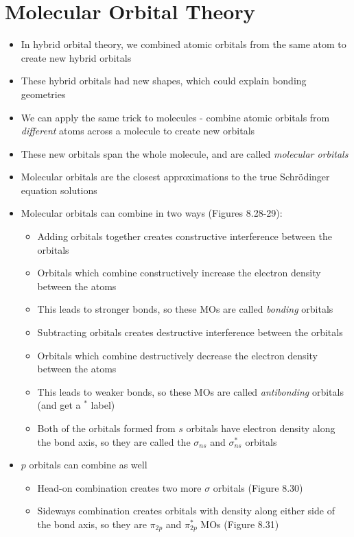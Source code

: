 \documentclass[12pt, openany, letterpaper]{memoir}
\begin{document}
\section{Molecular Orbital Theory}
\begin{itemize}
  \item In hybrid orbital theory, we combined atomic orbitals from the same atom to create new hybrid orbitals
	\item These hybrid orbitals had new shapes, which could explain bonding geometries
	\item We can apply the same trick to molecules - combine atomic orbitals from \emph{different} atoms across a molecule to create new orbitals
	\item These new orbitals span the whole molecule, and are called \emph{molecular orbitals}
	\item Molecular orbitals are the closest approximations to the true Schr\"odinger equation solutions
	\item Molecular orbitals can combine in two ways (Figures 8.28-29):
    \begin{itemize}
      \item Adding orbitals together creates constructive interference between the orbitals
      \item Orbitals which combine constructively increase the electron density between the atoms
      \item This leads to stronger bonds, so these MOs are called \emph{bonding} orbitals
      \item Subtracting orbitals creates destructive interference between the orbitals
      \item Orbitals which combine destructively decrease the electron density between the atoms
      \item This leads to weaker bonds, so these MOs are called \emph{antibonding} orbitals (and get a $^*$ label)
      \item Both of the orbitals formed from $s$ orbitals have electron density along the bond axis, so they are called the $\sigma_{ns}$ and $\sigma_{ns}^*$ orbitals
    \end{itemize}
	\item $p$ orbitals can combine as well
    \begin{itemize}
      \item Head-on combination creates two more $\sigma$ orbitals (Figure 8.30)
      \item Sideways combination creates orbitals with density along either side of the bond axis, so they are $\pi_{2p}$ and $\pi^*_{2p}$ MOs (Figure 8.31)

\end{itemize}
\end{itemize}
\end{document}
